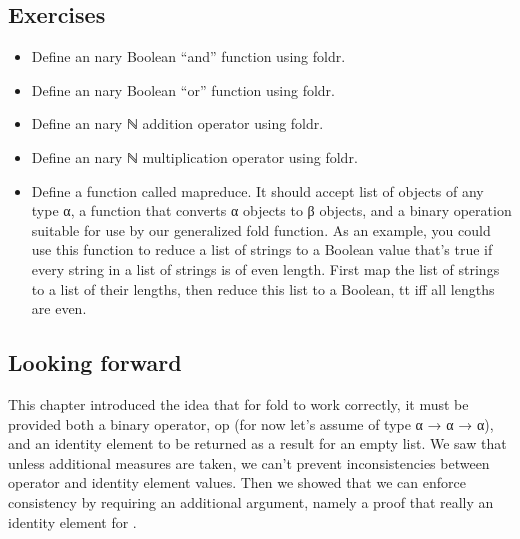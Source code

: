 \documentclass[letterpaper,10pt,english]{sphinxmanual}
\begin{document}
\subsection{Exercises}
\label{\detokenize{A_03_Recursive_Types:id6}}\begin{itemize}
\item {} 
\sphinxAtStartPar
Define an n\sphinxhyphen{}ary Boolean “and” function using foldr.

\item {} 
\sphinxAtStartPar
Define an n\sphinxhyphen{}ary Boolean “or” function using foldr.

\item {} 
\sphinxAtStartPar
Define an n\sphinxhyphen{}ary ℕ addition operator using foldr.

\item {} 
\sphinxAtStartPar
Define an n\sphinxhyphen{}ary ℕ multiplication operator using foldr.

\item {} 
\sphinxAtStartPar
Define a function called map\sphinxhyphen{}reduce. It should accept list of objects of any type α, a function that converts α objects to β objects, and a binary operation suitable for use by our generalized fold function. As an example, you could use this function to reduce a list of strings to a Boolean value that’s true if every string in a list of strings is of even length. First map the list of strings to a list of their lengths, then reduce this list to a Boolean, tt iff all lengths are even.

\end{itemize}


\subsection{Looking forward}
\label{\detokenize{A_03_Recursive_Types:looking-forward}}
\sphinxAtStartPar
This chapter introduced the idea that for fold to work
correctly, it must be provided both a binary operator, op
(for now let’s assume of type α → α → α), and an identity
element  to be returned as a result for
an empty list. We saw that unless additional measures are
taken, we can’t prevent inconsistencies between operator
and identity element values. Then we showed that we can
enforce consistency by requiring an additional argument,
namely a proof that  really  an identity element
for .
\end{document}
